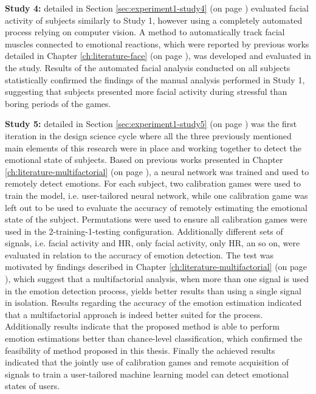 \textbf{Study 4:} detailed in Section \ref{sec:experiment1-study4} (on page \pageref{sec:experiment1-study4}) evaluated facial activity of subjects similarly to Study 1, however using a completely automated process relying on computer vision. A method to automatically track facial muscles connected to emotional reactions, which were reported by previous works detailed in Chapter \ref{ch:literature-face} (on page \pageref{ch:literature-face}), was developed and evaluated in the study. Results of the automated facial analysis conducted on all subjects statistically confirmed the findings of the manual analysis performed in Study 1, suggesting that subjects presented more facial activity during stressful than boring periods of the games.

\textbf{Study 5:} detailed in Section \ref{sec:experiment1-study5} (on page \pageref{sec:experiment1-study5}) was the first iteration in the design science cycle where all the three previously mentioned main elements of this research were in place and working together to detect the emotional state of subjects. Based on previous works presented in Chapter \ref{ch:literature-multifactorial} (on page \pageref{ch:literature-multifactorial}), a neural network was trained and used to remotely detect emotions. For each subject, two calibration games were used to train the model, i.e. user-tailored neural network, while one calibration game was left out to be used to evaluate the accuracy of remotely estimating the emotional state of the subject. Permutations were used to ensure all calibration games were used in the 2-training-1-testing configuration. Additionally different sets of signals, i.e. facial activity and HR, only facial activity, only HR, an so on, were evaluated in relation to the accuracy of emotion detection. The test was motivated by findings described in Chapter \ref{ch:literature-multifactorial} (on page \pageref{ch:literature-multifactorial}), which suggest that a multifactorial analysis, when more than one signal is used in the emotion detection process, yields better results than using a single signal in isolation. Results regarding the accuracy of the emotion estimation indicated that a multifactorial approach is indeed better suited for the process. Additionally results indicate that the proposed method is able to perform emotion estimations better than chance-level classification, which confirmed the feasibility of method proposed in this thesis. Finally the achieved results indicated that the jointly use of calibration games and remote acquisition of signals to train a user-tailored machine learning model can detect emotional states of users.

